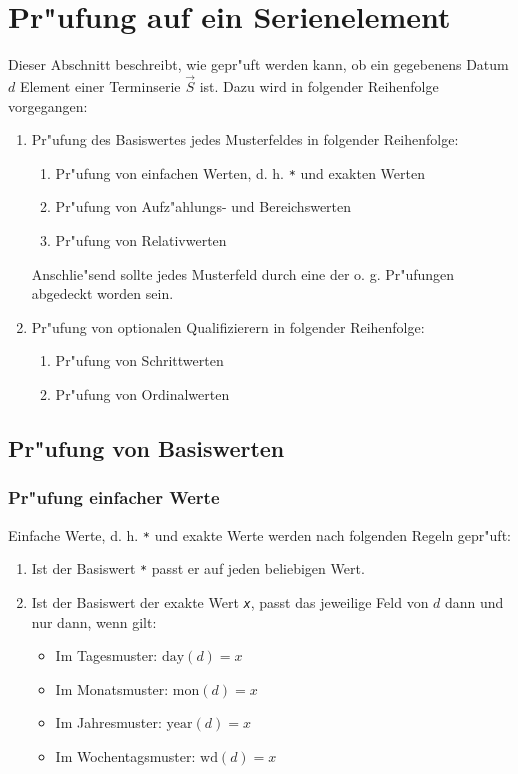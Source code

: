 \documentclass[a4paper]{article}
\newcommand*{\dayf}{\mathrm{day}}
\newcommand*{\monf}{\mathrm{mon}}
\newcommand*{\yearf}{\mathrm{year}}
\newcommand*{\wdf}{\mathrm{wd}}
\numberwithin{equation}{section}
\begin{document}
%
%
%
%
\section{Pr"ufung auf ein Serienelement}
\noindent Dieser Abschnitt beschreibt, wie gepr"uft werden kann, ob ein
gegebenens Datum $d$ Element einer Terminserie $\vec{S}$ ist. Dazu wird in
folgender Reihenfolge vorgegangen:
\begin{enumerate}
\item Pr"ufung des Basiswertes jedes Musterfeldes in folgender Reihenfolge:
  \begin{enumerate}
  \item Pr"ufung von einfachen Werten, d. h. \texttt{*} und exakten Werten
  \item Pr"ufung von Aufz"ahlungs- und Bereichswerten
  \item Pr"ufung von Relativwerten
  \end{enumerate}
  Anschlie"send sollte jedes Musterfeld durch eine der o. g. Pr"ufungen
  abgedeckt worden sein.
\item Pr"ufung von optionalen Qualifizierern in folgender Reihenfolge:
  \begin{enumerate}
  \item Pr"ufung von Schrittwerten
  \item Pr"ufung von Ordinalwerten
  \end{enumerate}
\end{enumerate}


\subsection{Pr"ufung von Basiswerten}
\subsubsection{Pr"ufung einfacher Werte}
Einfache Werte, d. h. \texttt{*} und exakte Werte werden nach folgenden Regeln
gepr"uft:
\begin{enumerate}
\item Ist der Basiswert \texttt{*} passt er auf jeden beliebigen Wert.
\item Ist der Basiswert der exakte Wert \texttt{\textit{x}}, passt das jeweilige
  Feld von $d$ dann und nur dann, wenn gilt:
  \begin{itemize}
  \item Im Tagesmuster: $\dayf(d) = x$
  \item Im Monatsmuster: $\monf(d) = x$
  \item Im Jahresmuster: $\yearf(d) = x$
  \item Im Wochentagsmuster: $\wdf(d) = x$
  \end{itemize}
\end{enumerate}
\end{document}
